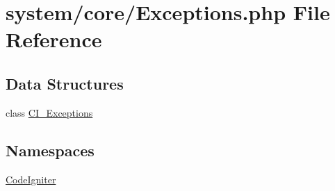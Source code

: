 \hypertarget{_exceptions_8php}{\section{system/core/\-Exceptions.php File Reference}
\label{_exceptions_8php}
}
\subsection*{Data Structures}
\begin{DoxyCompactItemize}
\item 
class \hyperlink{class_c_i___exceptions}{C\-I\-\_\-\-Exceptions}
\end{DoxyCompactItemize}
\subsection*{Namespaces}
\begin{DoxyCompactItemize}
\item 
\hyperlink{namespace_code_igniter}{Code\-Igniter}
\end{DoxyCompactItemize}
